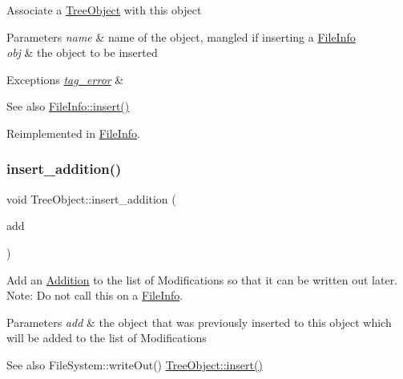 Associate a \mbox{\hyperlink{classTreeObject}{Tree\+Object}} with this object 
\begin{DoxyParams}{Parameters}
{\em name} & name of the object, mangled if inserting a \mbox{\hyperlink{classFileInfo}{File\+Info}} \\
\hline
{\em obj} & the object to be inserted \\
\hline
\end{DoxyParams}

\begin{DoxyExceptions}{Exceptions}
{\em \mbox{\hyperlink{classtag__error}{tag\+\_\+error}}} & \\
\hline
\end{DoxyExceptions}
\begin{DoxySeeAlso}{See also}
\mbox{\hyperlink{classFileInfo_ad93a84b63e417b07aa68b619051ab746}{File\+Info\+::insert()}} 
\end{DoxySeeAlso}


Reimplemented in \mbox{\hyperlink{classFileInfo_ad93a84b63e417b07aa68b619051ab746}{File\+Info}}.

\mbox{\label{classTreeObject_a41ce6080e0df5adcea4b0a76d35af885}} 
\subsubsection{\texorpdfstring{insert\+\_\+addition()}{insert\_addition()}}
{\footnotesize\ttfamily void Tree\+Object\+::insert\+\_\+addition (\begin{DoxyParamCaption}\item[{\mbox{\hyperlink{classTreeObject}{Tree\+Object}} $\ast$}]{add }\end{DoxyParamCaption})\hspace{0.3cm}{\ttfamily [virtual]}}

Add an \mbox{\hyperlink{classAddition}{Addition}} to the list of Modifications so that it can be written out later. Note\+: Do not call this on a \mbox{\hyperlink{classFileInfo}{File\+Info}}. 
\begin{DoxyParams}{Parameters}
{\em add} & the object that was previously inserted to this object which will be added to the list of Modifications \\
\hline
\end{DoxyParams}
\begin{DoxySeeAlso}{See also}
File\+System\+::write\+Out() \mbox{\hyperlink{classTreeObject_af8cc57edba9f435b52ccf33cfbbb2fc6}{Tree\+Object\+::insert()}} 
\end{DoxySeeAlso}


